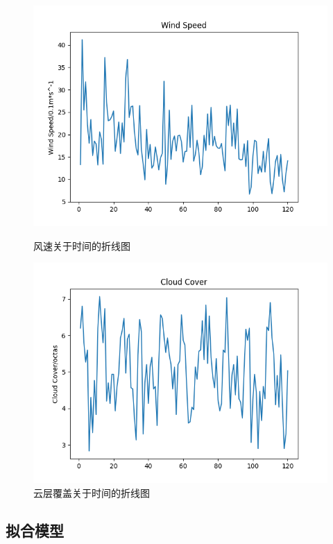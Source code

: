 \documentclass[UTF8, a4paper]{ctexart}
\begin{document}
\begin{figure}[h!]
	\centering
	\begin{minipage}[h!]{0.4\textwidth}
		\centering
		\includegraphics[scale=0.3]{../src/prepare_data/fg.png}
		\caption{风速关于时间的折线图}
	\end{minipage}
	\begin{minipage}[h!]{0.4\textwidth}
		\centering
		\includegraphics[scale=0.3]{../src/prepare_data/cc.png}
		\caption{云层覆盖关于时间的折线图}
	\end{minipage}
\end{figure}

\subsection{拟合模型}
\end{document}
